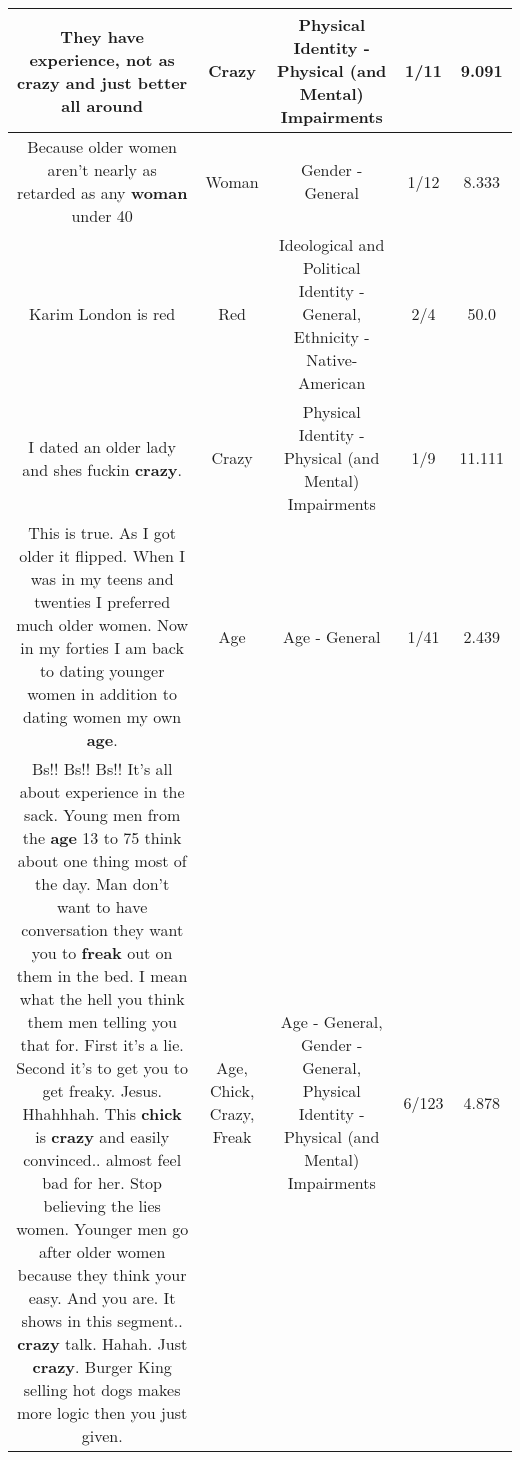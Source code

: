 \documentclass[11pt]{article}
\newlength\mylength
\begin{document}
\begin{center}
\begin{longtable}{|C{.65\mylength}|C{.30\mylength}|C{.12\mylength}|C{.12\mylength}|C{.12\mylength}|}
  \small They have experience, not as \textbf{crazy} and just better all around\normalsize   & Crazy & Physical Identity - Physical (and Mental) Impairments & 1/11 & 9.091 \\  \hline
  \small Because older women aren't nearly as retarded as any \textbf{woman} under 40\normalsize   & Woman & Gender - General & 1/12 & 8.333 \\  \hline
  \small Karim London is red\normalsize   & Red &  Ideological and Political Identity - General, Ethnicity - Native-American & 2/4 & 50.0 \\  \hline
  \small I dated an older lady and shes fuckin \textbf{crazy}.\normalsize   & Crazy & Physical Identity - Physical (and Mental) Impairments & 1/9 & 11.111 \\  \hline
  \small This is true. As I got older it flipped. When I was in my teens and twenties I preferred much older women. Now in my forties I am back to dating younger women in addition to dating women my own \textbf{age}.\normalsize   & Age & Age - General & 1/41 & 2.439 \\  \hline
  \small Bs!! Bs!! Bs!! It's all about experience in the sack.  Young  men from the \textbf{age} 13 to 75 think about one thing most of the day. Man don't want to have conversation they want you to \textbf{freak} out on them in the bed. I mean what the hell you think them men telling you that for. First it's a lie. Second it's to get you to get freaky. Jesus.  Hhahhhah.  This \textbf{chick} is \textbf{crazy} and easily convinced.. almost feel bad for her. Stop believing the lies women.  Younger men go after older women because they think your easy.  And you are.   It shows in this segment.. \textbf{crazy} talk. Hahah. Just \textbf{crazy}.  Burger King selling hot dogs makes more logic then you just given.\normalsize   & Age, Chick, Crazy, Freak & Age - General, Gender - General, Physical Identity - Physical (and Mental) Impairments & 6/123 & 4.878 \\  \hline

\end{longtable}
\end{center}
\end{document}
